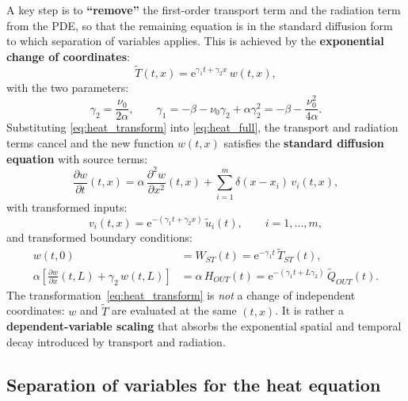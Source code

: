 A key step is to \textbf{``remove''} the first-order transport term and the
radiation term from the PDE, so that the remaining equation is in the standard
diffusion form to which separation of variables applies.  This is achieved by
the \textbf{exponential change of coordinates}:
\begin{equation}
  \tilde{T}(t,x) = \mathrm{e}^{\gamma_{1}t + \gamma_{2}x}\,w(t,x),
  \label{eq:heat_transform}
\end{equation}
with the two parameters:
\begin{equation}
  \gamma_{2} = \frac{\nu_{0}}{2\alpha},
  \qquad
  \gamma_{1} = -\beta - \nu_{0}\gamma_{2} + \alpha\gamma_{2}^{2}
  = -\beta - \frac{\nu_{0}^{2}}{4\alpha}.
  \label{eq:heat_params}
\end{equation}
Substituting \eqref{eq:heat_transform} into \eqref{eq:heat_full}, the transport
and radiation terms cancel and the new function $w(t,x)$ satisfies the
\textbf{standard diffusion equation} with source terms:
\begin{equation}
  \frac{\partial w}{\partial t}(t,x)
  = \alpha\,\frac{\partial^{2}w}{\partial x^{2}}(t,x)
  + \sum_{i=1}^{m}\delta(x - x_{i})\,v_{i}(t,x),
  \label{eq:heat_w_pde}
\end{equation}
with transformed inputs:
\begin{equation}
  v_{i}(t,x) = \mathrm{e}^{-(\gamma_{1}t + \gamma_{2}x)}\,\tilde{u}_{i}(t),
  \qquad i = 1,\ldots,m,
  \label{eq:heat_vi}
\end{equation}
and transformed boundary conditions:
\begin{align}
  w(t,0) &= W_{ST}(t) = \mathrm{e}^{-\gamma_{1}t}\,\tilde{T}_{ST}(t),\\[4pt]
  \alpha\!\left[\frac{\partial w}{\partial x}(t,L)
    + \gamma_{2}\,w(t,L)\right]
  &= \alpha\,H_{OUT}(t)
    = \mathrm{e}^{-(\gamma_{1}t + L\gamma_{2})}\,\tilde{Q}_{OUT}(t).
  \label{eq:heat_bc_transformed}
\end{align}
The transformation~\eqref{eq:heat_transform} is \emph{not} a change of
independent coordinates: $w$ and $\tilde{T}$ are evaluated at the same $(t,x)$.
It is rather a \textbf{dependent-variable scaling} that absorbs the exponential
spatial and temporal decay introduced by transport and radiation.


\subsection{Separation of variables for the heat equation}
\label{ssec:heat_sov}

